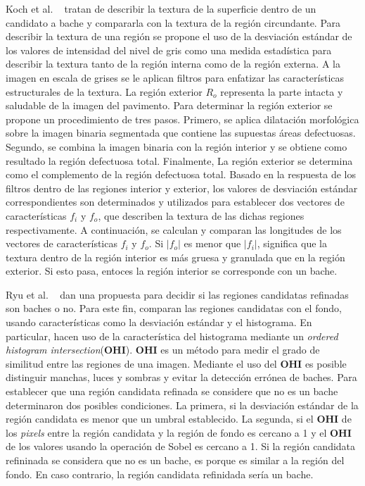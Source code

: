 Koch et al. ~ tratan de describir la textura de la superficie dentro de un candidato a bache y compararla con la textura de la 
región circundante. Para describir la textura de una región se propone el uso de la desviación estándar de los valores de intensidad del nivel 
de gris como una medida estadística para describir la textura  tanto de la región interna como de la región externa. A la imagen en escala de 
grises se le aplican filtros para enfatizar las características estructurales de la textura. La región exterior $R_o$ representa la parte intacta y 
saludable de la imagen del pavimento. Para determinar la región exterior se propone un  procedimiento de tres pasos. Primero, 
se aplica dilatación morfológica sobre la imagen binaria segmentada que contiene las supuestas áreas defectuosas. Segundo, 
se combina la imagen binaria con la región interior y se obtiene como resultado la región defectuosa total. Finalmente, 
La región exterior se determina como el complemento de la región defectuosa total. Basado en la respuesta de los filtros dentro de las regiones 
interior y exterior, los valores de desviación estándar correspondientes son determinados y utilizados para establecer dos vectores de características 
$f_i$ y $f_o$, que describen la textura de las dichas regiones respectivamente. A continuación, se calculan y comparan las longitudes de los vectores de 
características $f_i$ y $f_o$. Si $|f_o|$  es menor que  $|f_i|$, significa que la textura dentro de la región interior es más gruesa y granulada que en 
la región exterior. Si esto pasa, entoces la región interior se corresponde con un bache.


Ryu et al. ~ dan una propuesta para decidir si las regiones candidatas refinadas son baches o no. Para este fin, 
comparan las regiones candidatas con el fondo, usando características como la desviación estándar y el histograma. En particular, hacen 
uso de la característica del histograma mediante un \emph{ordered histogram intersection}(\textbf{OHI}). \textbf{OHI} es un método para 
medir el grado de similitud entre las regiones de una imagen. Mediante el uso del \textbf{OHI} es posible distinguir manchas, luces y 
sombras y evitar la detección errónea de baches. Para establecer que una región candidata refinada se considere que no es un bache 
determinaron dos posibles condiciones. La primera, si la desviación estándar de la región candidata es menor que un umbral establecido.
La segunda, si el \textbf{OHI} de los \emph{pixels} entre la región candidata y la región de fondo   es cercano a 1 y el \textbf{OHI}
de los valores usando la operación de Sobel es cercano a 1. Si la región candidata refininada se considera que no es un bache,
es porque es similar a la región del fondo. En caso contrario, la región candidata refinidada sería un bache.

